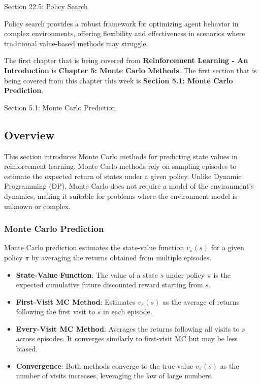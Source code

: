 \begin{notes}{Section 22.5: Policy Search}
\begin{highlight}
        Policy search provides a robust framework for optimizing agent behavior in complex environments, offering flexibility and effectiveness in scenarios where traditional value-based methods may struggle.
    
    \end{highlight}
\end{notes}

The first chapter that is being covered from \textbf{Reinforcement Learning - An Introduction} is \textbf{Chapter 5: Monte Carlo Methods}. The first section that is being covered from this chapter this
week is \textbf{Section 5.1: Monte Carlo Prediction}.

\begin{notes}{Section 5.1: Monte Carlo Prediction}
    \subsection*{Overview}

    This section introduces Monte Carlo methods for predicting state values in reinforcement learning. Monte Carlo methods rely on sampling episodes to estimate the expected return of states under a given 
    policy. Unlike Dynamic Programming (DP), Monte Carlo does not require a model of the environment's dynamics, making it suitable for problems where the environment model is unknown or complex.
    
    \subsubsection*{Monte Carlo Prediction}
    
    Monte Carlo prediction estimates the state-value function $v_\pi(s)$ for a given policy $\pi$ by averaging the returns obtained from multiple episodes.
    
    \begin{highlight}
    
        \begin{itemize}
            \item \textbf{State-Value Function}: The value of a state $s$ under policy $\pi$ is the expected cumulative future discounted reward starting from $s$.
            \item \textbf{First-Visit MC Method}: Estimates $v_\pi(s)$ as the average of returns following the first visit to $s$ in each episode.
            \item \textbf{Every-Visit MC Method}: Averages the returns following all visits to $s$ across episodes. It converges similarly to first-visit MC but may be less biased.
            \item \textbf{Convergence}: Both methods converge to the true value $v_\pi(s)$ as the number of visits increases, leveraging the law of large numbers.
        \end{itemize}
    

\end{highlight}
\end{notes}
